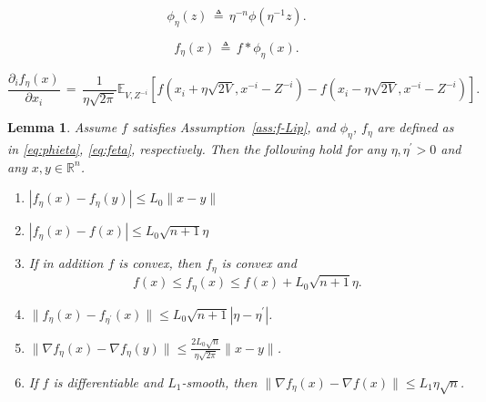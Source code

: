 \documentclass[10pt,a4paper]{amsart}
\newtheorem{lemma}{Lemma}
\newcommand{\R}{\mathbb R}
\newcommand{\mr}[1]{{\color{blue}#1}}
\newcommand{\pc}[1]{{\color{cyan}#1}}
\begin{document}
		\begin{equation}\label{eq:phieta}
			\phi_{\eta}(z) \, \triangleq \, \eta^{-n} \phi\left(\eta^{-1} z\right). 
		\end{equation}

		\begin{equation}\label{eq:feta}
			f_\eta(x) \, \triangleq \, f*\phi_\eta(x).
		\end{equation} 

			\begin{equation}\label{eq:GradientfetaD}
				\frac{\partial_i f_{\eta}(x)}{\partial x_i} \,  = \, \frac{1}{\eta \sqrt{2\pi}}\mathbb{E}_{V,Z^{-i}}\left[f\left(x_i+\eta\sqrt{2V},x^{-i}-Z^{-i}\right)-f\left(x_i-\eta\sqrt{2V},x^{-i}-Z^{-i}\right)\right].
			\end{equation}

		\begin{lemma}\label{Lemma:SmoothProperties} %
			Assume $f$ satisfies Assumption~\ref{ass:f-Lip}, and $ \phi_{\eta}$, $f_{\eta}$ are defined as in \eqref{eq:phieta}, \eqref{eq:feta}, respectively. Then the following hold for any $\eta, \eta^{\prime} > 0$ and any $x,y \in \R^n$. %
			\begin{enumerate}[label=\alph*.]
				\item \label{Lemma:b}$|f_{\eta}(x)-f_{\eta}(y)| \leq L_0\|x-y\|$ %
				\item \label{Lemma:c}$|f_{\eta}(x)-f(x)| \leq L_0\sqrt{n+1}\eta$ %
				\item \label{Lemma:d} If in addition $f$ is convex, then $f_\eta$ is convex and %
				\begin{equation}\label{eq:Lemmad}
					f(x) \leq f_\eta(x) \leq f(x)+L_0\sqrt{n+1}\eta.
				\end{equation}
				\item \label{Lemma:e} $\|f_\eta(x)-f_{\eta^{\prime}}(x)\| \leq L_0\sqrt{n+1}|\eta-\eta^{\prime}|$.
				\item \label{Lemma:f} $\|\nabla f_{\eta}(x) - \nabla f_{\eta}(y)\| \leq \frac{2L_0\sqrt{n}}{\eta \sqrt{2 \pi}}\|x-y\|$. %
				\item \label{Lemma:g} If $f$ is differentiable and $L_1$-smooth, then $\|\nabla f_{\eta}(x) - \nabla f(x)\| \leq L_1\eta \sqrt{n}$. %
			\end{enumerate}
		\end{lemma}
\end{document}

